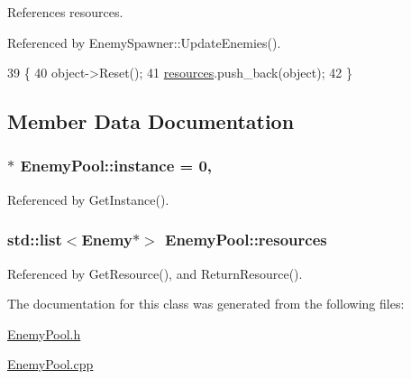 References resources.



Referenced by Enemy\-Spawner\-::\-Update\-Enemies().


\begin{DoxyCode}
39 \{
40     \textcolor{keywordtype}{object}->Reset();
41     \hyperlink{class_enemy_pool_a78b476ddede948197e107e8e594e25aa}{resources}.push\_back(\textcolor{keywordtype}{object});
42 \}
\end{DoxyCode}


\subsection{Member Data Documentation}
\hypertarget{class_enemy_pool_aff307b55d5b5a8faf8023ee78c06c5e0}{
\subsubsection[{instance}]{ $\ast$ Enemy\-Pool\-::instance = 0\hspace{0.3cm}{\ttfamily [static]}, {\ttfamily [private]}}}\label{class_enemy_pool_aff307b55d5b5a8faf8023ee78c06c5e0}


Referenced by Get\-Instance().

\hypertarget{class_enemy_pool_a78b476ddede948197e107e8e594e25aa}{
\subsubsection[{resources}]{\setlength{\rightskip}{0pt plus 5cm}std\-::list$<${\bf Enemy}$\ast$$>$ Enemy\-Pool\-::resources\hspace{0.3cm}{\ttfamily [private]}}}\label{class_enemy_pool_a78b476ddede948197e107e8e594e25aa}


Referenced by Get\-Resource(), and Return\-Resource().



The documentation for this class was generated from the following files\-:\begin{DoxyCompactItemize}
\item 
\hyperlink{_enemy_pool_8h}{Enemy\-Pool.\-h}\item 
\hyperlink{_enemy_pool_8cpp}{Enemy\-Pool.\-cpp}\end{DoxyCompactItemize}
